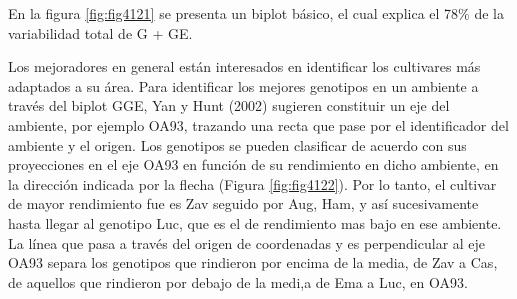 En la figura \ref{fig:fig4121} se presenta un biplot básico, el cual explica el 78\% de la variabilidad total de G + GE. 


Los mejoradores en general están interesados en identificar los cultivares más adaptados a su área. Para identificar los mejores genotipos en un ambiente a través del biplot GGE, Yan y Hunt (2002) sugieren constituir un eje del ambiente, por ejemplo OA93, trazando una recta que pase por el identificador del ambiente y el origen. Los genotipos se pueden clasificar de acuerdo con sus proyecciones en el eje OA93 en función de su rendimiento en dicho ambiente, en la dirección indicada por la flecha (Figura \ref{fig:fig4122}). Por lo tanto, el cultivar de mayor rendimiento fue es Zav seguido por Aug, Ham, y así sucesivamente hasta llegar al genotipo Luc, que es el de rendimiento mas bajo en ese ambiente. La línea que pasa a través del origen de coordenadas y es perpendicular al eje OA93 separa los genotipos que rindieron por encima de la media, de Zav a Cas, de aquellos que rindieron por debajo de la medi,a de Ema a Luc, en OA93.

